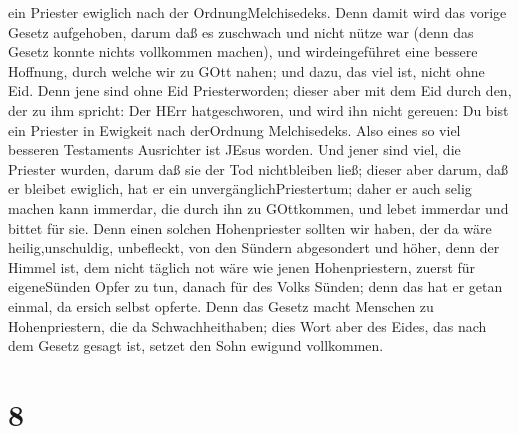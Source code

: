 ein Priester ewiglich nach der OrdnungMelchisedeks.  Denn
damit wird das vorige Gesetz aufgehoben, darum daß es zuschwach und
nicht nütze war  (denn das Gesetz konnte nichts vollkommen
machen), und wirdeingeführet eine bessere Hoffnung, durch welche wir zu
GOtt nahen;  und dazu, das viel ist, nicht ohne Eid. Denn
jene sind ohne Eid Priesterworden;  dieser aber mit dem Eid
durch den, der zu ihm spricht: Der HErr hatgeschworen, und wird ihn
nicht gereuen: Du bist ein Priester in Ewigkeit nach derOrdnung
Melchisedeks.  Also eines so viel besseren Testaments
Ausrichter ist JEsus worden.  Und jener sind viel, die
Priester wurden, darum daß sie der Tod nichtbleiben ließ; 
dieser aber darum, daß er bleibet ewiglich, hat er ein
unvergänglichPriestertum;  daher er auch selig machen kann
immerdar, die durch ihn zu GOttkommen, und lebet immerdar und bittet für
sie.  Denn einen solchen Hohenpriester sollten wir haben,
der da wäre heilig,unschuldig, unbefleckt, von den Sündern abgesondert
und höher, denn der Himmel ist,  dem nicht täglich not wäre
wie jenen Hohenpriestern, zuerst für eigeneSünden Opfer zu tun, danach
für des Volks Sünden; denn das hat er getan einmal, da ersich selbst
opferte.  Denn das Gesetz macht Menschen zu Hohenpriestern,
die da Schwachheithaben; dies Wort aber des Eides, das nach dem Gesetz
gesagt ist, setzet den Sohn ewigund vollkommen.

\hypertarget{section-6}{%
\section{8}\label{section-6}}

